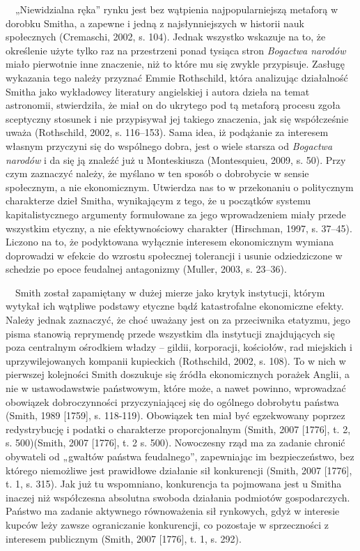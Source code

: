 \documentclass[a4paper]{article}
\begin{document}
 \ \ „Niewidzialna ręka” rynku jest bez wątpienia najpopularniejszą metaforą w dorobku Smitha, a zapewne i jedną z najsłynniejszych w historii nauk społecznych \label{ref:RND56kR0uPFkj}(Cremaschi, 2002, s. 104). Jednak wszystko wskazuje na to, że określenie użyte tylko raz na przestrzeni ponad tysiąca stron \textit{Bogactwa narodów} miało pierwotnie inne znaczenie, niż to które mu się zwykle przypisuje. Zasługę wykazania tego należy przyznać Emmie Rothschild, która analizując działalność Smitha jako wykładowcy literatury angielskiej i autora dzieła na temat astronomii, stwierdziła, że miał on do ukrytego pod tą metaforą procesu zgoła sceptyczny stosunek i nie przypisywał jej takiego znaczenia, jak się współcześnie uważa \label{ref:RNDX0KZpqEQRj}(Rothschild, 2002, s. 116–153). Sama idea, iż podążanie za interesem własnym przyczyni się do wspólnego dobra, jest o wiele starsza od \textit{Bogactwa narodów }i da się ją znaleźć już u Monteskiusza \label{ref:RNDStjVF4fTz2}(Montesquieu, 2009, s. 50). Przy czym zaznaczyć należy, że myślano w ten sposób o dobrobycie w sensie społecznym, a nie ekonomicznym. Utwierdza nas to w przekonaniu o politycznym charakterze dzieł Smitha, wynikającym z tego, że u początków systemu kapitalistycznego argumenty formułowane za jego wprowadzeniem miały przede wszystkim etyczny, a nie efektywnościowy charakter \label{ref:RNDkxQbrekKjf}(Hirschman, 1997, s. 37–45). Liczono na to, że podyktowana wyłącznie interesem ekonomicznym wymiana doprowadzi w efekcie do wzrostu społecznej tolerancji i usunie odziedziczone w schedzie po epoce feudalnej antagonizmy \label{ref:RNDYmmEjf3eVb}(Muller, 2003, s. 23–36).

\ \ Smith został zapamiętany w dużej mierze jako krytyk instytucji, którym wytykał ich wątpliwe podstawy etyczne bądź katastrofalne ekonomiczne efekty. Należy jednak zaznaczyć, że choć uważany jest on za przeciwnika etatyzmu, jego pisma stanowią reprymendę przede wszystkim dla instytucji znajdujących się poza centralnym ośrodkiem władzy – gildii, korporacji, kościołów, rad miejskich i uprzywilejowanych kompanii kupieckich \label{ref:RNDTxyZWr558R}(Rothschild, 2002, s. 108). To w nich w pierwszej kolejności Smith doszukuje się źródła ekonomicznych porażek Anglii, a nie w ustawodawstwie państwowym, które może, a nawet powinno, wprowadzać obowiązek dobroczynności przyczyniającej się do ogólnego dobrobytu państwa \label{ref:RNDW6eBaQF4K0}(Smith, 1989 [1759], s. 118-119). Obowiązek ten miał być egzekwowany poprzez redystrybucję i podatki o charakterze proporcjonalnym \label{ref:RNDpQhGODGDa8}(Smith, 2007 [1776], t. 2, s. 500)(Smith, 2007 [1776], t. 2 s. 500). Nowoczesny rząd ma za zadanie chronić obywateli od „gwałtów państwa feudalnego”, zapewniając im bezpieczeństwo, bez którego niemożliwe jest prawidłowe działanie sił konkurencji \label{ref:RNDWm3VFowt3n}(Smith, 2007 [1776], t. 1, s. 315). Jak już tu wspomniano, konkurencja ta pojmowana jest u Smitha inaczej niż współczesna absolutna swoboda działania podmiotów gospodarczych. Państwo ma zadanie aktywnego równoważenia sił rynkowych, gdyż w interesie kupców leży zawsze ograniczanie konkurencji, co pozostaje w sprzeczności z interesem publicznym \label{ref:RND2jnRYZ0Sx9}(Smith, 2007 [1776], t. 1, s. 292).
\end{document}
